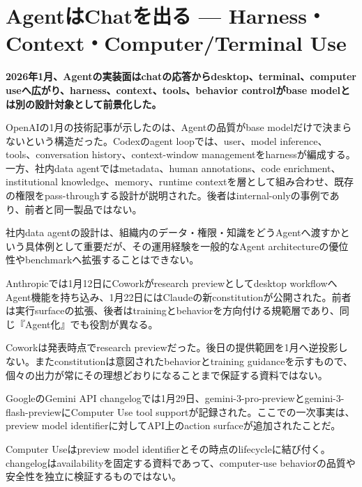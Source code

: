 \section{AgentはChatを出る — Harness・Context・Computer/Terminal Use}
\noindent\textbf{2026年1月、Agentの実装面はchatの応答からdesktop、terminal、computer useへ広がり、harness、context、tools、behavior controlがbase modelとは別の設計対象として前景化した。}\autocite{src-a24fd97eb3d0,src-ae10eb4597fe,src-d8b7c1c36830,src-f6aa679babd7}

OpenAIの1月の技術記事が示したのは、Agentの品質がbase modelだけで決まらないという構造だった。Codexのagent loopでは、user、model inference、tools、conversation history、context-window managementをharnessが編成する。一方、社内data agentではmetadata、human annotations、code enrichment、institutional knowledge、memory、runtime contextを層として組み合わせ、既存の権限をpass-throughする設計が説明された。後者はinternal-onlyの事例であり、前者と同一製品ではない。\autocite{src-ae10eb4597fe,src-fa5410010e0a}


\begin{claimboundary}
社内data agentの設計は、組織内のデータ・権限・知識をどうAgentへ渡すかという具体例として重要だが、その運用経験を一般的なAgent architectureの優位性やbenchmarkへ拡張することはできない。\autocite{src-ae10eb4597fe,src-fa5410010e0a}
\end{claimboundary}

Anthropicでは1月12日にCoworkがresearch previewとしてdesktop workflowへAgent機能を持ち込み、1月22日にはClaudeの新constitutionが公開された。前者は実行surfaceの拡張、後者はtrainingとbehaviorを方向付ける規範層であり、同じ『Agent化』でも役割が異なる。\autocite{src-f6aa679babd7}


\begin{claimboundary}
Coworkは発表時点でresearch previewだった。後日の提供範囲を1月へ逆投影しない。またconstitutionは意図されたbehaviorとtraining guidanceを示すもので、個々の出力が常にその理想どおりになることまで保証する資料ではない。\autocite{src-f6aa679babd7}
\end{claimboundary}

GoogleのGemini API changelogでは1月29日、gemini-3-pro-previewとgemini-3-flash-previewにComputer Use tool supportが記録された。ここでの一次事実は、preview model identifierに対してAPI上のaction surfaceが追加されたことだ。\autocite{src-a24fd97eb3d0}


\begin{claimboundary}
Computer Useはpreview model identifierとその時点のlifecycleに結び付く。changelogはavailabilityを固定する資料であって、computer-use behaviorの品質や安全性を独立に検証するものではない。\autocite{src-a24fd97eb3d0}
\end{claimboundary}

